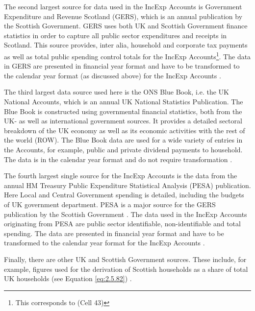 \bigskip

The second largest source for data used in the IncExp Accounts is Government Expenditure and Revenue Scotland (GERS), which is an annual publication by the Scottish Government. GERS uses both UK and Scottish Government finance statistics in order to capture all public sector expenditures and receipts in Scotland. This source provides, inter alia, household and corporate tax payments as well as total public spending control totals for the IncExp Accounts\footnote{This corresponds to (Cell 43)}. The data in GERS are presented in financial year format and have to be transformed to the calendar year format (as discussed above) for the IncExp Accounts \cite{ScotGov2013b}.

\bigskip

The third largest data source used here is the ONS Blue Book, i.e. the UK National Accounts, which is an annual UK National Statistics Publication. The Blue Book is constructed using governmental financial statistics, both from the UK- as well as international government sources. It provides a detailed sectoral breakdown of the UK economy as well as its economic activities with the rest of the world (ROW). The Blue Book data are used for a wide variety of entries in the Accounts, for example, public and private dividend payments to household. The data is in the calendar year format and do not require transformation \cite{ONS2011c}.

\bigskip

The fourth largest single source for the IncExp Accounts is the data from the annual HM Treasury Public Expenditure Statistical Analysis (PESA) publication. Here Local and Central Government spending is detailed, including the budgets of UK government department. PESA is a major source for the GERS publication by the Scottish Government \cite{ScotGov2013b}. The data used in the IncExp Accounts originating from PESA are public sector identifiable, non-identifiable and total spending. The data are presented in financial year format and have to be transformed to the calendar year format for the IncExp Accounts \cite{HMTR2012}.

\bigskip

Finally, there are other UK and Scottish Government sources. These include, for example, figures used for the derivation of Scottish households as a share of total UK households (see Equation \ref{eq:2.5.82}) \cite{ScotGov2012c, ONS2012}.

\bigskip

